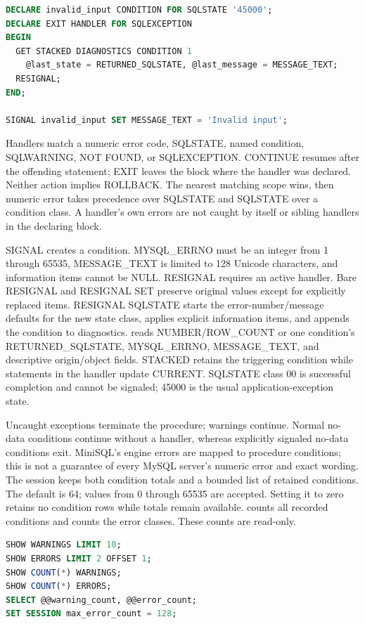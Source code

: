\begin{lstlisting}[language=SQL]
DECLARE invalid_input CONDITION FOR SQLSTATE '45000';
DECLARE EXIT HANDLER FOR SQLEXCEPTION
BEGIN
  GET STACKED DIAGNOSTICS CONDITION 1
    @last_state = RETURNED_SQLSTATE, @last_message = MESSAGE_TEXT;
  RESIGNAL;
END;

SIGNAL invalid_input SET MESSAGE_TEXT = 'Invalid input';
\end{lstlisting}

Handlers match a numeric error code, SQLSTATE, named condition, SQLWARNING,
NOT FOUND, or SQLEXCEPTION. CONTINUE resumes after the offending statement;
EXIT leaves the block where the handler was declared. Neither action implies
ROLLBACK. The nearest matching scope wins, then numeric error takes precedence
over SQLSTATE and SQLSTATE over a condition class. A handler's own errors are
not caught by itself or sibling handlers in the declaring block.

SIGNAL creates a condition. MYSQL\_ERRNO must be an integer from 1 through
65535, MESSAGE\_TEXT is limited to 128 Unicode characters, and information items cannot
be NULL. RESIGNAL requires an active handler. Bare RESIGNAL and RESIGNAL SET
preserve original values except for explicitly replaced items. RESIGNAL
SQLSTATE starts the error-number/message defaults for the new state class,
applies explicit information items, and appends the condition to diagnostics.
 reads NUMBER/ROW\_COUNT or one
condition's RETURNED\_SQLSTATE, MYSQL\_ERRNO, MESSAGE\_TEXT, and descriptive
origin/object fields. STACKED retains the triggering condition while statements
in the handler update CURRENT. SQLSTATE class 00 is successful completion and
cannot be signaled; 45000 is the usual application-exception state.

Uncaught exceptions terminate the procedure; warnings continue. Normal no-data
conditions continue without a handler, whereas explicitly signaled no-data
conditions exit. MiniSQL's engine errors are mapped to procedure conditions;
this is not a guarantee of every MySQL server's numeric error and exact wording.
The session keeps both condition totals and a bounded list of retained
conditions. The default  is 64; values from 0 through
65535 are accepted. Setting it to zero retains no condition rows while totals
remain available.  counts all recorded conditions and
 counts the error classes. These counts are read-only.

\begin{lstlisting}[language=SQL]
SHOW WARNINGS LIMIT 10;
SHOW ERRORS LIMIT 2 OFFSET 1;
SHOW COUNT(*) WARNINGS;
SHOW COUNT(*) ERRORS;
SELECT @@warning_count, @@error_count;
SET SESSION max_error_count = 128;
\end{lstlisting}


